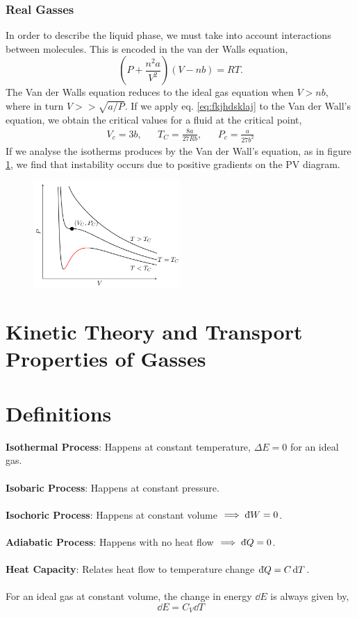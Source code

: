 \documentclass{book}
\newcommand{\dbar}{\mathrm{d}\hspace*{-0.08em}\bar{}\hspace*{0.1em}}
\begin{document}
\subsection{Real Gasses}
In order to describe the liquid phase, we must take into account interactions between molecules. This is encoded in the van der Walls equation,
\begin{equation}
	\boxed{\left(P + \frac{n^2a}{V^2}\right)\left(V - nb\right) = RT}.
\end{equation}
The Van der Walls equation reduces to the ideal gas equation when $V > nb$, where in turn $V >> \sqrt{a/P}$. If we apply eq. \eqref{eq:fkjhdsklaj} to the Van der Wall's equation, we obtain the critical values for a fluid at the critical point,
\begin{align}
	V_c = 3b, && T_C = \frac{8a}{27Rb}, && P_c = \frac{a}{27b^2}
\end{align}
If we analyse the isotherms produces by the Van der Wall's equation, as in figure \ref{fig:pv van}, we find that instability occurs due to positive gradients on the PV diagram.
\begin{figure}
	\centering
	\includegraphics[width=0.5\textwidth]{pv van.png}
	\caption{}
	\label{fig:pv van}
\end{figure}
\chapter{Kinetic Theory and Transport Properties of Gasses}
\appendix
\chapter{Definitions}
\textbf{Isothermal Process}:  Happens at constant temperature, $\Delta E = 0$ for an ideal gas.
\\\\
\textbf{Isobaric Process}: Happens at constant pressure.
\\\\
\textbf{Isochoric Process}: Happens at constant volume $\implies \dbar W = 0$.
\\\\
\textbf{Adiabatic Process}: Happens with no heat flow $\implies \dbar Q = 0$.
\\\\
\textbf{Heat Capacity}: Relates heat flow to temperature change $\dbar Q = C \dd{T}$.
\\\\
For an ideal gas at constant volume, the change in energy $\dd{E}$ is always given by,
\begin{equation}
	\dd{E} = C_V \dd{T}
\end{equation}
\end{document}
